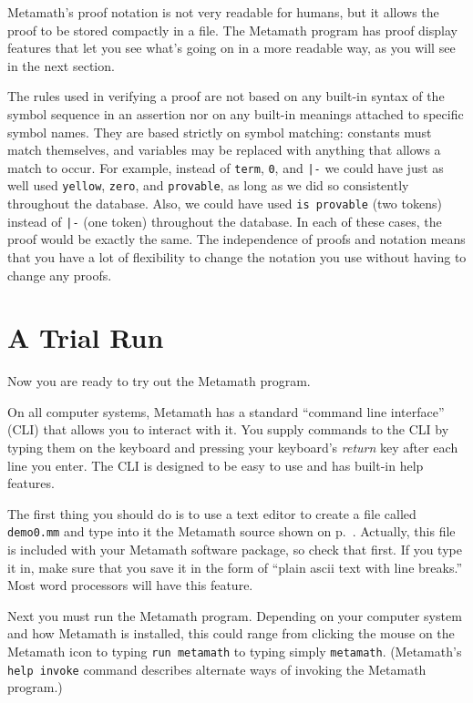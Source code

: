 Metamath's proof notation is not very readable for humans, but it allows the
proof to be stored compactly in a file.  The Metamath program
has proof display features that let you see what's going on in a more
readable way, as you will see in the next section.

The rules used in verifying a proof are not based on any built-in syntax of the
symbol sequence in an assertion nor on any built-in meanings
attached to specific symbol names.  They are based strictly on symbol
matching:  constants must match themselves, and
variables may be replaced with anything that allows a match to
occur.  For example, instead of \texttt{term}, \texttt{0}, and \verb$|-$ we could
have just as well used \texttt{yellow}, \texttt{zero}, and \texttt{provable}, as long
as we did so consistently throughout the database.  Also, we could have used
\texttt{is provable} (two tokens) instead of \verb$|-$ (one token) throughout the
database.  In each of these cases, the proof would be exactly the same.  The
independence of proofs and notation means that you have a lot of flexibility to
change the notation you use without having to change any proofs.

\section{A Trial Run}\label{trialrun}

Now you are ready to try out the Metamath program.

On all computer systems, Metamath has a standard ``command line
interface'' (CLI) that allows you to
interact with it.  You supply commands to the CLI by typing them on the
keyboard and pressing your keyboard's {\em return} key after each line
you enter.  The CLI is designed to be easy to use and has built-in help
features.

The first thing you should do is to use a text editor to create a file
called \texttt{demo0.mm} and type into it the Metamath source shown on
p.~\pageref{demo0}.  Actually, this file is included with your Metamath
software package, so check that first.  If you type it in, make sure
that you save it in the form of ``plain {\sc ascii} text with line
breaks.''  Most word processors will have this feature.

Next you must run the Metamath program.  Depending on your computer
system and how Metamath is installed, this could range from clicking the
mouse on the Metamath icon to typing \texttt{run metamath} to typing
simply \texttt{metamath}.  (Metamath's {\tt help invoke} command describes
alternate ways of invoking the Metamath program.)

